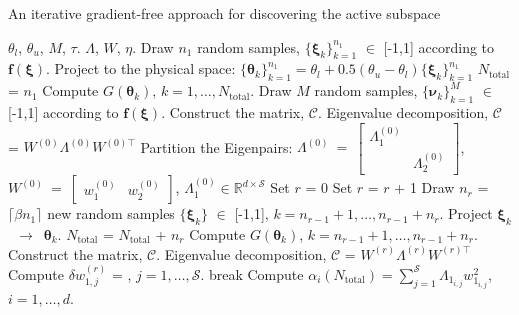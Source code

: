 \bigskip
\begin{breakablealgorithm}
\renewcommand{\algorithmicrequire}{\textbf{Input:}}
\renewcommand{\algorithmicensure}{\textbf{Output:}}
  \caption{An iterative gradient-free approach for discovering the active subspace}
  \begin{algorithmic}[1]
\Require $\theta_l$, $\theta_u$, $M$, $\tau$. 
\Ensure $\Lambda$, $W$, $\eta$. 
	\State Draw $n_1$ random samples, $\{\bm{\xi}_k\}_{k=1}^{n_1}$ $\in$ [-1,1]
         according to $\bm{f(\xi)}$.
	\State Project to the physical space:
        $\{\bm{\theta}_k\}_{k=1}^{n_1}=\theta_l+0.5(\theta_u-\theta_l)\{\bm{\xi}_k\}_{k=1}^{n_1}$
	\State $N_\text{total}$ = $n_1$ 
	\State Compute $G(\bm\theta_k)$, $k=1, \ldots, N_\text{total}$.
	\State Draw $M$ random samples, $\{\bm{\nu}_k\}_{k=1}^{M}$ $\in$ [-1,1]
         according to $\bm{f(\xi)}$.
	\State Construct the matrix, $\mathcal{C}$.
	\State Eigenvalue decomposition, $\mathcal{C}$ = $W^{(0)}\Lambda^{(0)} W^{(0)\top}$
	\State Partition the Eigenpairs: $\Lambda^{(0)}~=~ 
        \begin{bmatrix} \Lambda_1^{(0)} & \\ & \Lambda_2^{(0)} \end{bmatrix}$, 
        $W^{(0)}~=~\begin{bmatrix} w_1^{(0)} & w_2^{(0)} \end{bmatrix}$, 
        $\Lambda_1^{(0)}\in \mathbb{R}^{d\times\mathcal{S}}$
	\State Set $r$ = 0
	\Loop
		\State Set $r$ = $r$ + 1
		\State Draw $n_r$ = $\lceil \beta n_1 \rceil$ new random samples 
                $\{\bm{\xi}_k\}$ $\in$ [-1,1], $k = n_{r-1}+1,\ldots,n_{r-1}+n_r$.
		\State Project $\bm{\xi}_k$~$\rightarrow$~$\bm{\theta}_k$.
		\State $N_\text{total}$ = $N_\text{total}$ + $n_r$ 
		\State Compute $G(\bm\theta_k)$, $k=n_{r-1}+1, \ldots, n_{r-1}+n_r$.  
		\State Construct the matrix, $\mathcal{C}$.
		\State Eigenvalue decomposition, $\mathcal{C}$ = $W^{(r)}\Lambda^{(r)} W^{(r)\top}$
		\State Compute $\delta w_{1,j}^{(r)}$ = 
                       , 
                       $j = 1,\ldots,\mathcal{S}$.
			\State break
		\EndIf
	\EndLoop
	\State Compute $\alpha_i(N_\text{total}) = \sum\limits_{j=1}^{\mathcal{S}} \Lambda_{1_{i,j}}w_{1_{i,j}}^2$,
	$i=1,\ldots,d$.
    \EndProcedure
  \end{algorithmic}
  \label{alg:free1}
\end{breakablealgorithm}
\bigskip

